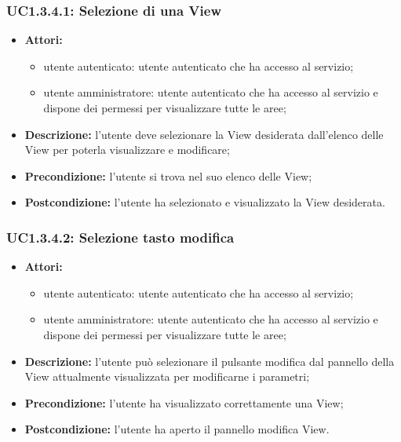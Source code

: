 \subsubsection{UC1.3.4.1: Selezione di una View}

\begin{itemize}
    \item \textbf{Attori:}
    \begin{itemize}
    	\item utente autenticato: utente autenticato che ha accesso al servizio;
    	\item utente amministratore: utente autenticato che ha accesso al servizio e dispone dei permessi per visualizzare tutte le aree;
	\end{itemize}
    \item \textbf{Descrizione:} l'utente deve selezionare la View\gloss{} desiderata dall'elenco delle View per poterla visualizzare e modificare;
    \item \textbf{Precondizione:} l'utente si trova nel suo elenco delle View\gloss{};
    \item \textbf{Postcondizione:} l'utente ha selezionato e visualizzato la View\gloss{} desiderata.
\end{itemize}

\subsubsection{UC1.3.4.2: Selezione tasto modifica}

\begin{itemize}
   	\item \textbf{Attori:}
    \begin{itemize}
    	\item utente autenticato: utente autenticato che ha accesso al servizio;
    	\item utente amministratore: utente autenticato che ha accesso al servizio e dispone dei permessi per visualizzare tutte le aree;
	\end{itemize}
    \item \textbf{Descrizione:} l'utente può selezionare il pulsante modifica dal pannello della View\gloss{} attualmente visualizzata per modificarne i parametri;
    \item \textbf{Precondizione:} l'utente ha visualizzato correttamente una View\gloss{};
    \item \textbf{Postcondizione:} l'utente ha aperto il pannello modifica View\gloss{}.
\end{itemize}

